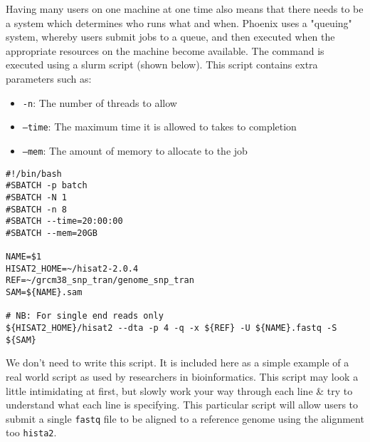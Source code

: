 \begin{information}
Having many users on one machine at one time also means that there needs to be a system which determines who runs what and when. 
Phoenix uses a "queuing" system, whereby users submit jobs to a queue, and then executed when the appropriate resources on the machine become available. 
The command is executed using a slurm script (shown below). 
This script contains extra parameters such as:

\begin{itemize}
\item \texttt{-n}: The number of threads to allow
\item \texttt{--time}: The maximum time it is allowed to takes to completion
\item \texttt{--mem}: The amount of memory to allocate to the job
\end{itemize}

\begin{lstlisting}
#!/bin/bash
#SBATCH -p batch
#SBATCH -N 1
#SBATCH -n 8
#SBATCH --time=20:00:00
#SBATCH --mem=20GB

NAME=$1
HISAT2_HOME=~/hisat2-2.0.4
REF=~/grcm38_snp_tran/genome_snp_tran
SAM=${NAME}.sam

# NB: For single end reads only
${HISAT2_HOME}/hisat2 --dta -p 4 -q -x ${REF} -U ${NAME}.fastq -S ${SAM}

\end{lstlisting}

We don't need to write this script.
It is included here as a simple example of a real world script as used by researchers in bioinformatics.
This script may look a little intimidating at first, but slowly work your way through each line \& try to understand what each line is specifying.
This particular script will allow users to submit a single \texttt{fastq} file to be aligned to a reference genome using the alignment too \texttt{hista2}.
\end{information}
